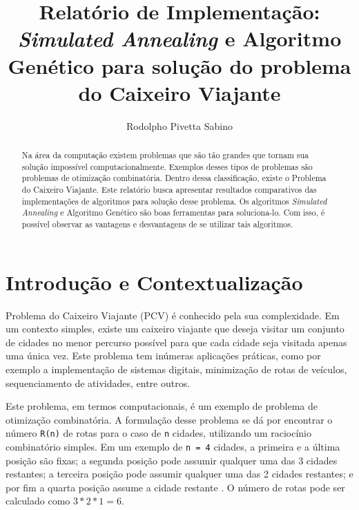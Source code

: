 \documentclass[journal, a4paper]{IEEEtran}
\begin{document}
	\title{Relatório de Implementação: \textit{Simulated Annealing} e Algoritmo Genético para solução do problema do Caixeiro Viajante}
	\author{Rodolpho Pivetta Sabino}
	\maketitle

\begin{abstract}
	Na área da computação existem problemas que são tão grandes que tornam sua solução impossível computacionalmente. Exemplos desses tipos de problemas são problemas de otimização combinatória. Dentro dessa classificação, existe o Problema do Caixeiro Viajante. Este relatório busca apresentar resultados comparativos das implementações de algoritmos para solução desse problema. Os algoritmos \textit{Simulated Annealing} e Algoritmo Genético são boas ferramentas para soluciona-lo. Com isso, é possível observar as vantagens e desvantagens de se utilizar tais algoritmos.
\end{abstract}

\section{Introdução e Contextualização}
	 Problema do Caixeiro Viajante (PCV) é conhecido pela sua complexidade. Em um contexto simples, existe um caixeiro viajante que deseja visitar um conjunto de cidades no menor percurso possível para que cada cidade seja visitada apenas uma única vez. Este problema tem inúmeras aplicações práticas, como por exemplo a implementação de sistemas digitais, minimização de rotas de veículos, sequenciamento de atividades, entre outros.

    Este problema, em termos computacionais, é um exemplo de problema de otimização combinatória. A formulação desse problema se dá por encontrar o número \texttt{R(n)} de rotas para o caso de \texttt{n} cidades, utilizando um raciocínio combinatório simples. Em um exemplo de \texttt{n = 4} cidades, a primeira e a última posição são fixas; a segunda posição pode assumir qualquer uma das 3 cidades restantes; a terceira posição pode assumir qualquer uma das 2 cidades restantes; e por fim a quarta posição assume a cidade restante \cite{portocv}. O número de rotas pode ser calculado como $3 * 2 * 1 = 6$.
\end{document}
